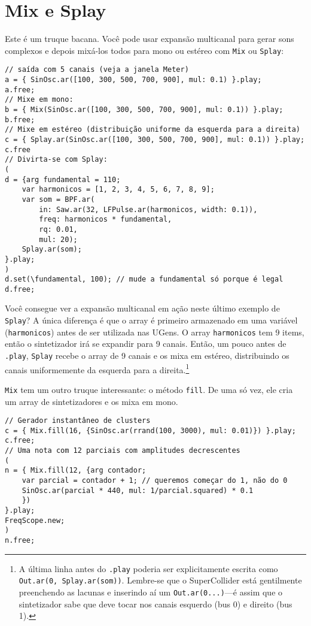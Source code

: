 \section{Mix e Splay}

Este é um truque bacana. Você pode usar expansão multicanal para gerar sons complexos e depois mixá-los todos para mono ou estéreo com \texttt{Mix} ou \texttt{Splay}:
 
\begin{lstlisting}[style=SuperCollider-IDE, basicstyle=\scttfamily\footnotesize]
// saída com 5 canais (veja a janela Meter)
a = { SinOsc.ar([100, 300, 500, 700, 900], mul: 0.1) }.play;
a.free;
// Mixe em mono:
b = { Mix(SinOsc.ar([100, 300, 500, 700, 900], mul: 0.1)) }.play;
b.free;
// Mixe em estéreo (distribuição uniforme da esquerda para a direita)
c = { Splay.ar(SinOsc.ar([100, 300, 500, 700, 900], mul: 0.1)) }.play;
c.free
// Divirta-se com Splay:
(
d = {arg fundamental = 110;
	var harmonicos = [1, 2, 3, 4, 5, 6, 7, 8, 9];
	var som = BPF.ar(
		in: Saw.ar(32, LFPulse.ar(harmonicos, width: 0.1)),
		freq: harmonicos * fundamental,
		rq: 0.01,
		mul: 20);
	Splay.ar(som);	
}.play;
)
d.set(\fundamental, 100); // mude a fundamental só porque é legal
d.free;
\end{lstlisting}
 
Você consegue ver a expansão multicanal em ação neste último exemplo de \texttt{Splay}? A única diferença é que o array é primeiro armazenado em uma variável (\texttt{harmonicos}) antes de ser utilizada nas UGens. O array \texttt{harmonicos} tem 9 items, então o sintetizador irá se expandir para 9 canais. Então, um pouco antes de \texttt{.play}, \texttt{Splay} recebe o array de 9 canais e os mixa em estéreo, distribuindo os canais uniformemente da esquerda para a direita.\footnote{A última linha antes do \texttt{.play} poderia ser explicitamente escrita como \texttt{Out.ar(0, Splay.ar(som))}. Lembre-se que o SuperCollider está gentilmente preenchendo as lacunas e inserindo aí um
\texttt{Out.ar(0...)}---é assim que o sintetizador sabe que deve tocar nos canais esquerdo (bus 0) e direito (bus 1).}

\texttt{Mix} tem um outro truque interessante: o método \texttt{fill}. De uma só vez, ele cria um array de sintetizadores e os mixa em mono.

\begin{lstlisting}[style=SuperCollider-IDE, basicstyle=\scttfamily\footnotesize]
// Gerador instantâneo de clusters
c = { Mix.fill(16, {SinOsc.ar(rrand(100, 3000), mul: 0.01)}) }.play;
c.free;
// Uma nota com 12 parciais com amplitudes decrescentes
(
n = { Mix.fill(12, {arg contador;
	var parcial = contador + 1; // queremos começar do 1, não do 0
	SinOsc.ar(parcial * 440, mul: 1/parcial.squared) * 0.1
	})
}.play;
FreqScope.new;
)
n.free;
\end{lstlisting}

